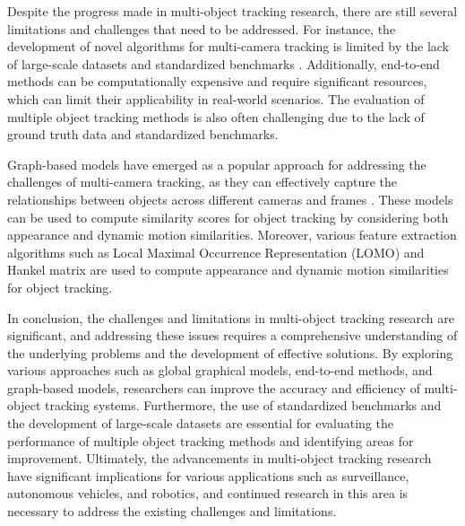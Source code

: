 \documentclass[conference]{IEEEtran}
\begin{document}
Despite the progress made in multi-object tracking research, there are still several limitations and challenges that need to be addressed. For instance, the development of novel algorithms for multi-camera tracking is limited by the lack of large-scale datasets and standardized benchmarks \cite{Tracking the Trackers: An Analysis of the State of the Art in Multiple Object Tracking}. Additionally, end-to-end methods can be computationally expensive and require significant resources, which can limit their applicability in real-world scenarios. The evaluation of multiple object tracking methods is also often challenging due to the lack of ground truth data and standardized benchmarks.

Graph-based models have emerged as a popular approach for addressing the challenges of multi-camera tracking, as they can effectively capture the relationships between objects across different cameras and frames \cite{An equalised global graphical model-based approach for multi-camera object tracking}. These models can be used to compute similarity scores for object tracking by considering both appearance and dynamic motion similarities. Moreover, various feature extraction algorithms such as Local Maximal Occurrence Representation (LOMO) and Hankel matrix are used to compute appearance and dynamic motion similarities for object tracking.

In conclusion, the challenges and limitations in multi-object tracking research are significant, and addressing these issues requires a comprehensive understanding of the underlying problems and the development of effective solutions. By exploring various approaches such as global graphical models, end-to-end methods, and graph-based models, researchers can improve the accuracy and efficiency of multi-object tracking systems. Furthermore, the use of standardized benchmarks and the development of large-scale datasets are essential for evaluating the performance of multiple object tracking methods and identifying areas for improvement. Ultimately, the advancements in multi-object tracking research have significant implications for various applications such as surveillance, autonomous vehicles, and robotics, and continued research in this area is necessary to address the existing challenges and limitations.
\end{document}
